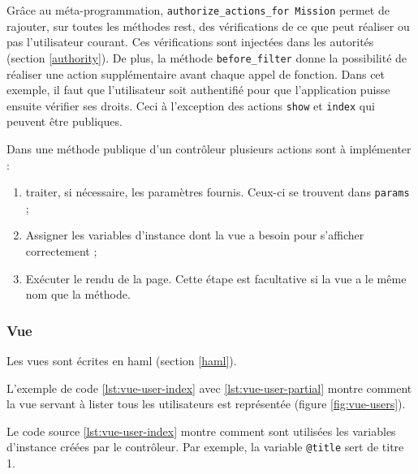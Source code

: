\begin{figure}
\end{figure}

Grâce au méta-programmation, \lstinline[language=Rails]{authorize_actions_for Mission} permet de rajouter, sur toutes les méthodes \gls{rest}, des vérifications de ce que peut réaliser ou pas l'utilisateur courant. Ces vérifications sont injectées dans les autorités (section \ref{authority}). De plus, la méthode \lstinline[language=Rails]{before_filter} donne la possibilité de réaliser une action supplémentaire avant chaque appel de fonction. Dans cet exemple, il faut que l'utilisateur soit authentifié pour que l'application puisse ensuite vérifier ses droits. Ceci à l'exception des actions \texttt{show} et \texttt{index} qui peuvent être publiques.

Dans une méthode publique d'un contrôleur plusieurs actions sont à implémenter :
\begin{enumerate}
  \item traiter, si nécessaire, les paramètres fournis. Ceux-ci se trouvent dans \lstinline[language=Rails]{params} ;
  \item Assigner les variables d'instance dont la vue a besoin pour s'afficher correctement ;
  \item Exécuter le rendu de la page. Cette étape est facultative si la vue a le même nom que la méthode.
\end{enumerate}

\subsubsection{Vue}
\label{vues}
Les vues sont écrites en haml (section \ref{haml}).

L'exemple de code \ref{lst:vue-user-index} avec \ref{lst:vue-user-partial} montre comment la vue servant à lister tous les utilisateurs est représentée (figure \ref{fig:vue-users}).

\begin{figure}

\end{figure}

Le code source \ref{lst:vue-user-index} montre comment sont utilisées les variables d'instance créées par le contrôleur. Par exemple, la variable \texttt{@title} sert de titre 1.

